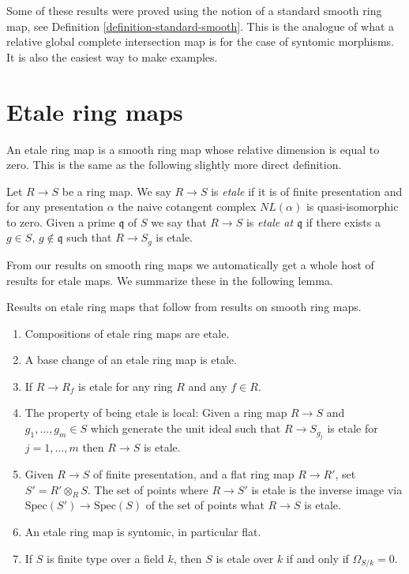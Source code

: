 Some of these results were proved using the notion of a standard
smooth ring map, see Definition \ref{definition-standard-smooth}.
This is the analogue of what a relative global 
complete intersection map is for the case of syntomic morphisms.
It is also the easiest way to make examples.













\section{Etale ring maps}
\label{section-etale}

\noindent
An etale ring map is a smooth ring map whose relative dimension
is equal to zero. This is the same as the following slightly more
direct definition.

\begin{definition}
\label{definition-etale}
Let $R \to S$ be a ring map.
We say $R \to S$ is {\it etale} if it is of finite presentation
and for any presentation $\alpha$ the naive cotangent complex
$NL(\alpha)$ is quasi-isomorphic to zero. Given a prime $\mathfrak q$
of $S$ we say that $R \to S$ is {\it etale at $\mathfrak q$}
if there exists a $g \in S$, $g \not \in \mathfrak q$ such that
$R \to S_g$ is etale.
\end{definition}

\noindent
From our results on smooth ring maps we automatically get a whole host
of results for etale maps. We summarize these in the following
lemma.

\begin{lemma}
\label{lemma-etale}
Results on etale ring maps that follow from results on smooth ring maps.
\begin{enumerate}
\item Compositions of etale ring maps are etale.
\item A base change of an etale ring map is etale.
\item If $R \to R_f$ is etale for any ring $R$ and any $f \in R$.
\item The property of being etale is local: Given a ring map
$R \to S$ and $g_1, \ldots, g_m \in S$ which generate the unit ideal
such that $R \to S_{g_j}$ is etale for $j = 1, \ldots, m$ then
$R \to S$ is etale.
\item Given $R \to S$ of finite presentation, and a flat ring map
$R \to R'$, set $S' = R' \otimes_R S$. The set of points where $R \to S'$
is etale is the inverse image via $\text{Spec}(S') \to \text{Spec}(S)$
of the set of points what $R \to S$ is etale.
\item An etale ring map is syntomic, in particular flat.
\item If $S$ is finite type over a field $k$, then $S$ is etale over
$k$ if and only if $\Omega_{S/k} = 0$.
\end{enumerate}
\end{lemma}

